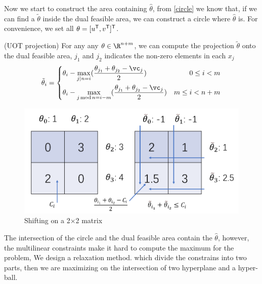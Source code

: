 Now we start to construct the area containing $\hat{\theta}$, from \ref{circle} we know that, if we can find a $\tilde{\theta}$ inside the dual feasible area, we can construct a circle where $\hat{\theta}$ is.  For convenience, we set all $\theta = [u^{\mathsf T},v^{\mathsf T}]^{\mathsf T}$.
\begin{thm}
(UOT projection) For any any $\theta \in \R^{n+m}$, we can compute the projection $\tilde{\theta}$ onto the dual feasible area, $j_1$ and $j_2$ indicates the non-zero elements in each $x_j$
 \begin{equation}
		\tilde{\theta}_{i}=\left\{
	\begin{aligned}
			&\theta_{i} - \max_{j \mid n = i}(\frac{\theta_{j_{1}}+\theta_{j_{2}}-\vc_j}{2}) & 0\leq i<m\\
			&\theta_{i} - \max_{j \operatorname{mod} n= i-m}(\frac{\theta_{j_{1}}+\theta_{j_{2}}-\vc_j}{2}) & m\leq i<n+m
	\end{aligned}
	\right.
 \end{equation}
\end{thm}
	\begin{figure}[htbp]
	\begin{center}	
	\includegraphics[width=0.8\hsize]{pic/shifting}
	\caption{Shifting on a 2$\times$2 matrix}
	\end{center}	
	\end{figure}

The intersection of the circle and the dual feasible area contain the $\hat{\theta}$, however, the multilinear constraints make it hard to compute the maximum for the problem, We design a relaxation method. which divide the constrains into two parts, then we are maximizing on the intersection of two hyperplane and a hyper-ball. 


